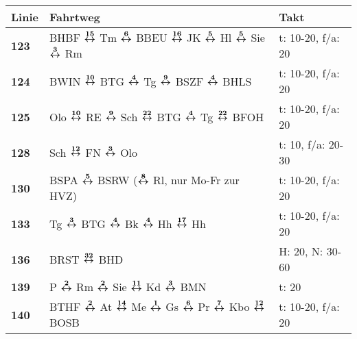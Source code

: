\begin{minipage}[t]{0.05\textwidth}
\phantom{Tor}
\end{minipage}
\begin{minipage}[t]{0.45\textwidth}
\begin{tabular}{>{\bfseries}L{1.2cm}L{9.0cm}L{3.0cm}}
{\bfseries Linie} & {\bfseries Fahrtweg} & {\bfseries Takt} \\
\hline
\bus{} 123    & BHBF $\xarwe{15}$ Tm $\xarwe{6}$ BBEU $\xarwe{16}$ JK $\xarwe{5}$ Hl $\xarwe{5}$ Sie $\xarwe{3}$ Rm                                                                 & t: 10-20, f/a: 20          \\
\bus{} 124    & BWIN $\xarwe{10}$ BTG $\xarwe{4}$ Tg $\xarwe{9}$ BSZF $\xarwe{4}$ BHLS                                                                                              & t: 10-20, f/a: 20          \\
\bus{} 125    & Olo $\xarwe{10}$ RE $\xarwe{9}$ Sch $\xarwe{22}$ BTG $\xarwe{4}$ Tg $\xarwe{22}$ BFOH                                                                               & t: 10-20, f/a: 20          \\
\bus{} 128    & Sch $\xarwe{12}$ FN $\xarwe{3}$ Olo                                                                                                                 & t: 10, f/a: 20-30          \\
\bus{} 130    & BSPA $\xarwe{5}$ BSRW ($\xarwe{8}$ Rl, nur Mo-Fr zur HVZ)                                                                                                           & t: 10-20, f/a: 20          \\
\bus{} 133    & Tg $\xarwe{3}$ BTG $\xarwe{4}$ Bk $\xarwe{4}$ Hh $\xarwe{17}$ Hh                                                                                                    & t: 10-20, f/a: 20          \\
\bus{} 136    & BRST $\xarwe{32}$ BHD                                                                                                                                               & H: 20, N: 30-60            \\
\bus{} 139    & P $\xarwe{2}$ Rm $\xarwe{2}$ Sie $\xarwe{11}$ Kd $\xarwe{3}$ BMN                                                                                                    & t: 20                      \\
\bus{} 140    & BTHF $\xarwe{2}$ At $\xarwe{14}$ Me $\xarwe{1}$ Gs $\xarwe{6}$ Pr $\xarwe{7}$ Kbo $\xarwe{12}$ BOSB                                                                 & t: 10-20, f/a: 20          \\

\end{tabular}
\end{minipage}
